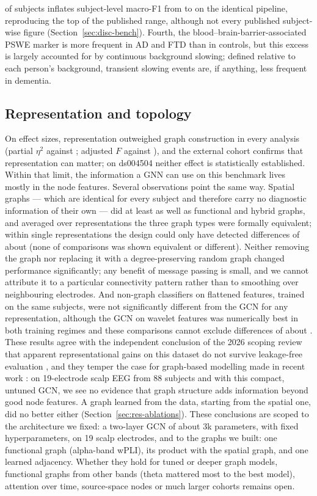 of subjects inflates subject-level macro-F1 from \cleakPThreespatialCorrectSubj{} to \cleakPThreespatialLeakySubj{} on the identical pipeline,
reproducing the top of the published range, although not every published subject-wise figure
(Section~\ref{sec:disc-bench}). Fourth, the
blood--brain-barrier-associated PSWE marker is more frequent in AD and FTD than in controls, but this
excess is largely accounted for by continuous background slowing; defined relative to each person's background,
transient slowing events are, if anything, less frequent in dementia.

\subsection{Representation and topology}
On effect sizes, representation outweighed graph construction in every analysis (partial $\eta^2$
\anovaRepEta{} against \anovaEdgeEta{}; adjusted $F$ \nbSelRepF{} against \nbSelEdgeF{}), and the external cohort
confirms that representation can matter; on ds004504 neither effect is statistically established. Within
that limit, the information a GNN can use on this benchmark lives mostly in the node features. Several observations point the same way. Spatial graphs --- which are identical for every
subject and therefore carry no diagnostic information of their own --- did at least as well as
functional and hybrid graphs, and averaged over representations the three graph types were formally
equivalent; within single representations the design could only have detected differences of about
\eqGraphRepMde{} (none of \eqGraphRepN{} comparisons was shown equivalent or different). Neither removing the
graph nor replacing it with a degree-preserving random graph changed performance significantly; any
benefit of message passing is small, and we cannot
attribute it to a particular connectivity pattern rather than to smoothing over neighbouring
electrodes. And non-graph classifiers on flattened features, trained on the same subjects, were not
significantly different from the GCN for any representation, although the GCN on wavelet features was
numerically best in both training regimes and these comparisons cannot exclude differences of about
\eqGvcMde{}. These results agree
with the independent conclusion of the 2026 scoping review that apparent representational gains on
this dataset do not survive leakage-free evaluation \cite{R1}, and they temper the case for
graph-based modelling made in recent work \cite{R2,R8,F7}: on 19-electrode scalp EEG from 88
subjects and with this compact, untuned GCN, we see no evidence that graph structure adds information
beyond good node features. A graph learned from the data, starting from the spatial one, did no better
either (Section~\ref{sec:res-ablations}). These conclusions are scoped to the architecture we fixed: a
two-layer GCN of about 3k parameters, with fixed hyperparameters, on 19 scalp electrodes, and to the graphs
we built: one functional graph (alpha-band wPLI), its product with the spatial graph, and one learned
adjacency. Whether they hold for tuned or deeper graph models, functional graphs from other bands (theta
mattered most to the best model), attention over time, source-space nodes or much larger cohorts
remains open.

